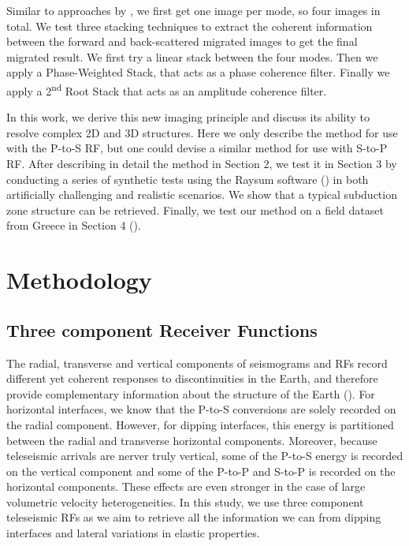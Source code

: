 \documentclass[9pt,a4paper]{article}
\numberwithin{equation}{section}
\begin{document}
\begin{multicols}{2}
Similar to approaches by \cite{rond_sgeo_09}, we first get one image per mode, so four images in total.
We test three stacking techniques to extract the coherent information between the forward and back-scattered migrated images to get the final migrated result.
We first try a linear stack between the four modes.
Then we apply a Phase-Weighted Stack, that acts as a phase coherence filter.
Finally we apply a 2\textsuperscript{nd} Root Stack that acts as an amplitude coherence filter.

In this work, we derive this new imaging principle and discuss its ability to resolve complex 2D and 3D structures. 
Here we only describe the method for use with the P-to-S RF, but one could devise a similar method for use with S-to-P RF. 
After describing in detail the method in Section 2, we test it in Section 3 by conducting a series of synthetic tests using the Raysum software (\cite{fred_gji_00}) in both artificially challenging and realistic scenarios. 
We show that a typical subduction zone structure can be retrieved.
Finally, we test our method on a field dataset from Greece in Section 4 (\cite{pear_jgr_12}).

\section{Methodology}

\subsection{Three component Receiver Functions}

The radial, transverse and vertical components of seismograms and RFs record different yet coherent responses to discontinuities in the Earth, and therefore provide complementary information about the structure of the Earth (\cite{tone_epsl_08}).
For horizontal interfaces, we know that the P-to-S conversions are solely recorded on the radial component. 
However, for dipping interfaces, this energy is partitioned between the radial and transverse horizontal components.
Moreover, because teleseismic arrivals are nerver truly vertical, some of the P-to-S energy is recorded on the vertical component and some of the P-to-P and S-to-P is recorded on the horizontal components.
These effects are even stronger in the case of large volumetric velocity heterogeneities.
In this study, we use three component teleseismic RFs as we aim to retrieve all the information we can from dipping interfaces and lateral variations in elastic properties.


\end{multicols}
\end{document}

